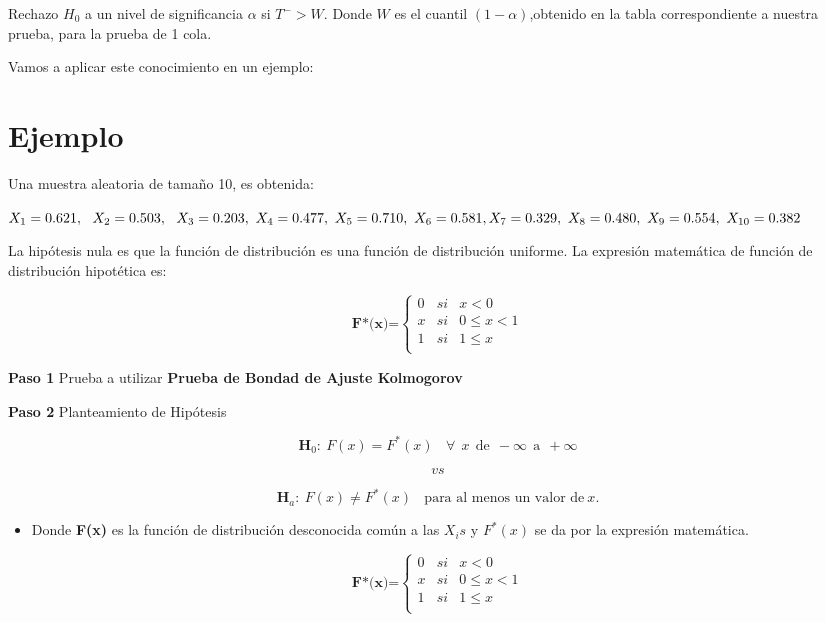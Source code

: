 \documentclass[
  a4paper,
  oneside,
  openany]{book}
\providecommand{\tightlist}{%
  \setlength{\itemsep}{0pt}\setlength{\parskip}{0pt}}
\begin{document}
Rechazo \(H_0\) a un nivel de significancia \(\alpha\) si \(T^->W\). Donde \(W\) es el cuantil \((1-\alpha)\),obtenido en la tabla correspondiente a nuestra prueba, para la prueba de 1 cola.

Vamos a aplicar este conocimiento en un ejemplo:

\hypertarget{ejemplo-12}{%
\section{Ejemplo}\label{ejemplo-12}}

Una muestra aleatoria de tamaño 10, es obtenida:

\(X_{1}=0.621,\ \ X_{2}=0.503, \ \ X_{3}=0.203, \ X_{4}=0.477, \ X_{5}=0.710, \ X_{6}=0.581, \\ X_{7}=0.329, \ X_{8}=0.480, \  X_{9}=0.554, \ X_{10}=0.382\)

La hipótesis nula es que la función de distribución es una función de distribución uniforme.
La expresión matemática de función de distribución hipotética es:

\[
\textbf{F*(x)=} \left\{
\begin{array}{lcc}
0 & si & x < 0 \\
x & si & 0 \leq x < 1 \\
1 & si & 1 \leq x \\
\end{array}
\right.
\]

\textbf{Paso 1} Prueba a utilizar \textbf{Prueba de Bondad de Ajuste Kolmogorov}

\textbf{Paso 2} Planteamiento de Hipótesis

\[\textbf{H}_0: \ F(x)=F^*(x) \ \ \ \ \forall \ \ x \ \ \mbox{de} \ \ -\infty \ \  \mbox{a} \ \  +\infty\]

\[vs\]

\[\textbf{H}_a: \ F(x) \neq F^*(x) \ \ \ \ \mbox{para al menos un  valor de} \  x.\]

\begin{itemize}
\tightlist
\item
  Donde \textbf{F(x)} es la función de distribución desconocida común a las \(X_{i}s\) y \(F^*(x)\) se da por la expresión matemática.
\end{itemize}

\[
\textbf{F*(x)=} \left\{
\begin{array}{lcc}
0 & si & x < 0 \\
x & si & 0 \leq x < 1 \\
1 & si & 1 \leq x \\
\end{array}
\right.
\]
\end{document}
